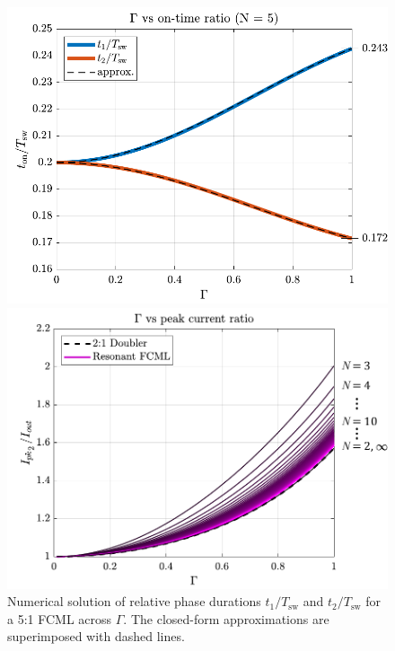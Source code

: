 \begin{figure}[b]
\hspace{-20pt}
\begin{minipage}{0.34\linewidth}
    \centering
    \includegraphics[width=1\linewidth]{Figures/ResonantFCML_Ton_N=5.pdf}
	\caption{Numerical solution of relative phase durations $t_1/T_{\textrm{sw}}$ and $t_2/T_{\textrm{sw}}$ for a 5:1 FCML across $\Gamma$. The closed-form approximations are superimposed with dashed lines.}
	\label{fig:Gamma_vs_Ton}
\end{minipage}
\hfill
\begin{minipage}{0.36\linewidth}
    \centering
    \includegraphics[width=1\linewidth]{Figures/ResonantFCML_IpkIout_b.pdf}

\end{minipage}
\end{figure}
